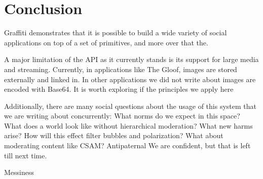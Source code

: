 \section{Conclusion}

Graffiti demonstrates
that it is possible to build a wide variety
of social applications on top of a set of primitives,
and more over that the.

A major limitation of the API as it currently stands
is its support for large media and streaming.
Currently, in applications like The Gloof, images
are stored externally and linked in. In other applications
we did not write about images are encoded with Base64.
It is worth exploring if the principles we apply here

Additionally, there are many social questions about
the usage of this system that we are writing about concurrently:
What norms do we expect in this space?
What does a world look like without hierarchical moderation?
What new harms arise?
How will this effect filter bubbles and polarization?
What about moderating content like CSAM?
Antipaternal
We are confident, but that is left till next time.

Messiness
